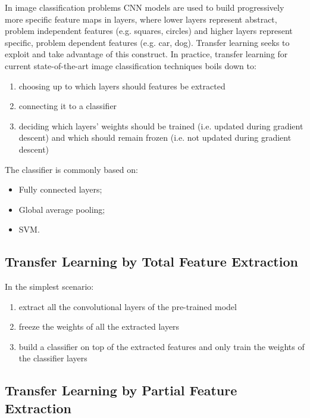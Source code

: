 In image classification problems \ac{CNN} models are used to build progressively more specific feature maps in layers, where lower layers represent abstract, problem independent features (e.g. squares, circles) and higher layers represent specific, problem dependent features (e.g. car, dog). Transfer learning seeks to exploit and take advantage of this construct. In practice, transfer learning for current state-of-the-art image classification techniques boils down to:

\begin{enumerate}
    \item choosing up to which layers should features be extracted
    \item connecting it to a classifier
    \item deciding which layers' weights should be trained (i.e. updated during gradient descent) and which should remain frozen (i.e. not updated during gradient descent)
\end{enumerate}

The classifier is commonly based on:

\begin{itemize}
    \item Fully connected layers;
    \item Global average pooling;
    \item SVM.
\end{itemize}

\subsection{Transfer Learning by Total Feature Extraction}

In the simplest scenario:

\begin{enumerate}
    \item extract all the convolutional layers of the pre-trained model
    \item freeze the weights of all the extracted layers
    \item build a classifier on top of the extracted features and only train the weights of the classifier layers
\end{enumerate}

\subsection{Transfer Learning by Partial Feature Extraction}

